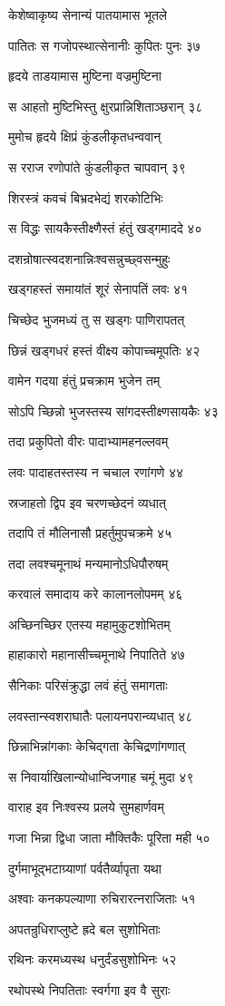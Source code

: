 केशेष्वाकृष्य सेनान्यं पातयामास भूतले

पातितः स गजोपस्थात्सेनानीः कुपितः पुनः ३७

हृदये ताडयामास मुष्टिना वज्रमुष्टिना

स आहतो मुष्टिभिस्तु क्षुरप्रान्निशिताञ्छरान् ३८

मुमोच हृदये क्षिप्रं कुंडलीकृतधन्ववान्

स रराज रणोपांते कुंडलीकृत चापवान् ३९

शिरस्त्रं कवचं बिभ्रदभेद्यं शरकोटिभिः

स विद्धः सायकैस्तीक्ष्णैस्तं हंतुं खड्गमाददे ४०

दशन्रोषात्स्वदशनान्निःश्वसन्नुच्छ्वसन्मुहुः

खड्गहस्तं समायांतं शूरं सेनापतिं लवः ४१

चिच्छेद भुजमध्यं तु स खड्गः पाणिरापतत्

छिन्नं खड्गधरं हस्तं वीक्ष्य कोपाच्चमूपतिः ४२

वामेन गदया हंतुं प्रचक्राम भुजेन तम्

सोऽपि च्छिन्नो भुजस्तस्य सांगदस्तीक्ष्णसायकैः ४३

तदा प्रकुपितो वीरः पादाभ्यामहनल्लवम्

लवः पादाहतस्तस्य न चचाल रणांगणे ४४

स्रजाहतो द्विप इव चरणच्छेदनं व्यधात्

तदापि तं मौलिनासौ प्रहर्तुमुपचक्रमे ४५

तदा लवश्चमूनाथं मन्यमानोऽधिपौरुषम्

करवालं समादाय करे कालानलोपमम् ४६

अच्छिनच्छिर एतस्य महामुकुटशोभितम्

हाहाकारो महानासीच्चमूनाथे निपातिते ४७

सैनिकाः परिसंक्रुद्धा लवं हंतुं समागताः

लवस्तान्स्वशराघातैः पलायनपरान्व्यधात् ४८

छिन्नाभिन्नांगकाः केचिद्गता केचिद्रणांगणात्

स निवार्याखिलान्योधान्विजगाह चमूं मुदा ४९

वाराह इव निःश्वस्य प्रलये सुमहार्णवम्

गजा भिन्ना द्विधा जाता मौक्तिकैः पूरिता मही ५०

दुर्गमाभूद्भटाग्र्याणां पर्वतैर्व्यापृता यथा

अश्वाः कनकपल्याणा रुचिरारत्नराजिताः ५१

अपतन्रुधिराप्लुष्टे ह्रदे बल सुशोभिताः

रथिनः करमध्यस्थ धनुर्दंडसुशोभिनः ५२

रथोपस्थे निपतिताः स्वर्गगा इव वै सुराः

